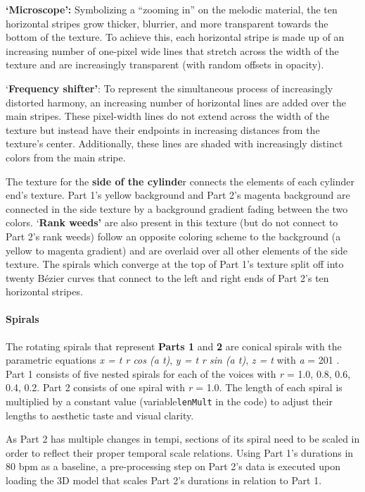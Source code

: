 \documentclass[sigconf]{nimeart}
\begin{document}
\textbf{`Microscope':} Symbolizing a ``zooming in'' on the melodic material, the ten horizontal stripes grow thicker, blurrier, and more transparent towards the bottom of the texture. To achieve this, each horizontal stripe is made up of an increasing number of one-pixel wide lines that stretch across the width of the texture and are increasingly transparent (with random offsets in opacity).~

`\textbf{Frequency shifter'}: To represent the simultaneous process of increasingly distorted harmony, an increasing number of horizontal lines are added over the main stripes. These pixel-width lines do not extend across the width of the texture but instead have their endpoints in increasing distances from the texture's center. Additionally, these lines are shaded with increasingly distinct colors from the main stripe.

The texture for the \textbf{side of the cylinde}r connects the elements of each cylinder end's texture. Part 1's yellow background and Part 2's magenta background are connected in the side texture by a background gradient fading between the two colors. `\textbf{Rank weeds'} are also present in this texture (but do not connect to Part 2's rank weeds) follow an opposite coloring scheme to the background (a yellow to magenta gradient) and are overlaid over all other elements of the side texture. The spirals which converge at the top of Part 1's texture split off into twenty Bézier curves that connect to the left and right ends of Part 2's ten horizontal stripes.

\paragraph{Spirals}\label{spirals}

The rotating spirals that represent \textbf{Parts 1} and \textbf{2} are conical spirals with the parametric equations \emph{x = t r cos (a t)}, \emph{y = t r sin (a t)}, \emph{z = t} with \emph{a} = 201 \cite{c31}. Part 1 consists of five nested spirals for each of the voices with \emph{r} = 1.0, 0.8, 0.6, 0.4, 0.2. Part 2 consists of one spiral with \emph{r} = 1.0. The length of each spiral is multiplied by a constant value (variable\texttt{lenMult} in the code) to adjust their lengths to aesthetic taste and visual clarity.

As Part 2 has multiple changes in tempi, sections of its spiral need to be scaled in order to reflect their proper temporal scale relations. Using Part 1's durations in 80 bpm as a baseline, a pre-processing step on Part 2's data is executed upon loading the 3D model that scales Part 2's durations in relation to Part 1.
\end{document}
